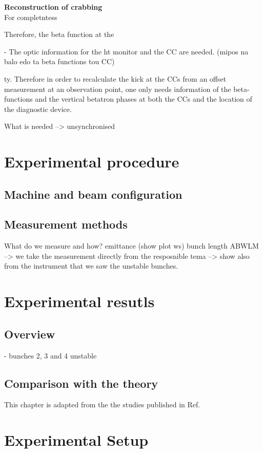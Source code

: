 \normalsize{\textbf{Reconstruction of crabbing}}\\
For completntess


Therefore, the beta function at the 


- The optic information for the ht monitor and the CC are needed.  (mipos na balo edo ta beta functions tou CC)

ty. Therefore in order
to recalculate the kick at the CCs from an offset measurement at an observation point, one only needs information of
the beta-functions and the vertical betatron phases at both
the CCs and the location of the diagnostic device.


\newpage



What is needed --> unsynchronised


\section{Experimental procedure}

\subsection{Machine and beam configuration}
\subsection{Measurement methods}
 What do we measure and how? emittance (show plot ws)
 bunch length ABWLM --> we take the measurement directly from the resposnible tema
 --> show also from the instrument that we saw the unstable bunches.

 \section{Experimental resutls}
 \subsection{Overview}
 - bunches 2, 3 and 4 unstable
 \subsection{Comparison with the theory}

 \newpage 
 This chapter is adapted from the the studies published in Ref.~\cite{Triantafyllou}

 \section{Experimental Setup} %

